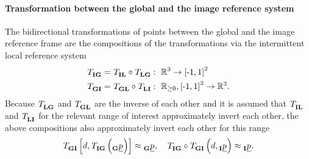 \paragraph*{Transformation between the global and the image reference system} $\ $\\
The bidirectional transformations of points between the global and the image reference frame
are the compositions of the transformations via the intermittent local reference system
\begin{align} \label{eq:global_image_transformations}
    \trafo[]{}{\irs\grs}{}{}
    &=
    \trafo[]{}{\irs\lrs}{}{} \circ \trafo[]{}{\lrs\grs}{}{}
    :\ 
    \mathbb{R}^3 \rightarrow \left[\text{-} 1, 1\right]^2 
    \nonumber \\
    \trafo[]{}{\grs\irs}{}{}
    &=
    \trafo[]{}{\grs\lrs}{}{} \circ \trafo[]{}{\lrs\irs}{}{}
    :\ 
    \mathbb{R}_{\ge 0}, \left[\text{-} 1, 1\right]^2 \rightarrow \mathbb{R}^3.
\end{align}
Because
$\trafo[]{}{\lrs\grs}{}{}$
and
$\trafo[]{}{\grs\lrs}{}{}$
are the inverse of each other
and it is assumed that
$\trafo[]{}{\irs\lrs}{}{}$
and
$\trafo[]{}{\lrs\irs}{}{}$
for the relevant range of interest
approximately invert each other,
the above compositions also approximately invert each other for this range
\begin{equation}
    \trafo[]{}{\grs\irs}{}{} \left[
        d, \trafo[]{}{\irs\grs}{}{} \left( \pos[]{}{}{\grs}{} \right)
    \right]
    \approx
    \pos[]{}{}{\grs}{}
    ,\quad
    \trafo[]{}{\irs\grs}{}{}
    \circ 
    \trafo[]{}{\grs\irs}{}{} \left(
        d, \pos[]{}{}{\irs}{}
    \right)
    \approx
    \pos[]{}{}{\irs}{}.
\end{equation}

